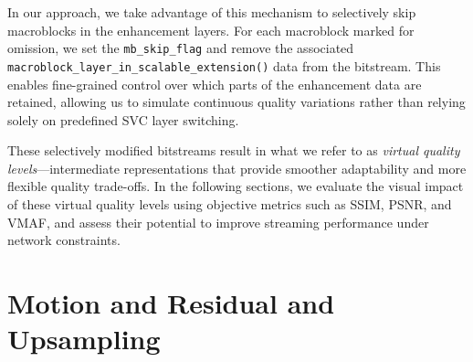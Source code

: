     In our approach, we take advantage of this mechanism to selectively skip
    macroblocks in the enhancement layers. For each macroblock marked for omission,
    we set the \texttt{mb\_skip\_flag} and remove the associated
    \texttt{macroblock\_layer\_in\_scalable\_extension()} data from the bitstream.
    This enables fine-grained control over which parts of the enhancement data are
    retained, allowing us to simulate continuous quality variations rather than
    relying solely on predefined SVC layer switching.

    These selectively modified bitstreams result in what we refer to as
    \textit{virtual quality levels}—intermediate representations that provide
    smoother adaptability and more flexible quality trade-offs. In the following
    sections, we evaluate the visual impact of these virtual quality levels using
    objective metrics such as SSIM, PSNR, and VMAF, and assess their potential to
    improve streaming performance under network constraints.


\section{Motion and Residual and Upsampling}
